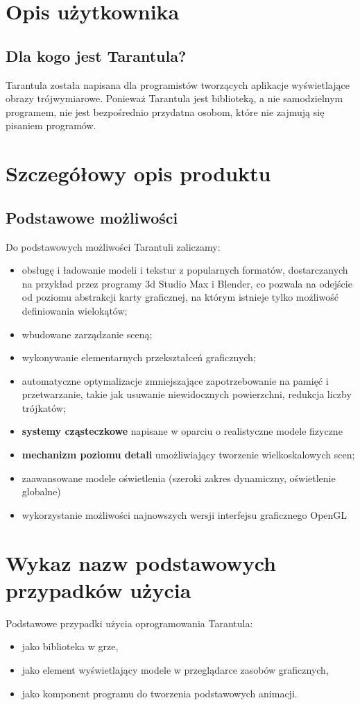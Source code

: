 \documentclass[11pt,leqno]{article}
\begin{document}
\section{Opis użytkownika}
\subsection{Dla kogo jest Tarantula?}
\noindent
Tarantula została napisana dla programistów tworzących aplikacje wyświetlające obrazy trójwymiarowe. Ponieważ Tarantula jest biblioteką, a nie samodzielnym programem, 
nie jest bezpośrednio przydatna osobom, które nie zajmują się pisaniem programów.

\section{Szczegółowy opis produktu}

\subsection{Podstawowe możliwości}
\noindent
Do podstawowych możliwości Tarantuli zaliczamy:
\begin{itemize}
 \item obsługę i ładowanie modeli i tekstur z popularnych formatów, dostarczanych na przykład przez programy 3d Studio Max i Blender, co pozwala na odejście od poziomu abstrakcji karty graficznej, na którym istnieje tylko możliwość definiowania wielokątów;
  \item wbudowane zarządzanie sceną;
\item wykonywanie elementarnych przekształceń graficznych;
\item automatyczne optymalizacje zmniejszające zapotrzebowanie na pamięć i przetwarzanie, takie jak usuwanie niewidocznych powierzchni, redukcja liczby trójkatów;
\item {\bf systemy cząsteczkowe} napisane w oparciu o realistyczne modele fizyczne
\item {\bf mechanizm poziomu detali} umożliwiający tworzenie wielkoskalowych scen;
\item zaawansowane modele oświetlenia (szeroki zakres dynamiczny, oświetlenie globalne)
\item wykorzystanie możliwości najnowszych wersji interfejsu graficznego OpenGL
\end{itemize}


\section{Wykaz nazw podstawowych przypadków użycia}
Podstawowe przypadki użycia oprogramowania Tarantula:
\begin{itemize}
\item jako biblioteka w grze,
\item jako element wyświetlający modele w przeglądarce zasobów graficznych,
\item jako komponent programu do tworzenia podstawowych animacji.
\end{itemize}
\end{document}
